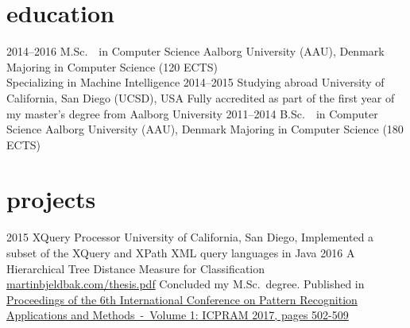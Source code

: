 \documentclass{afriggeri-cv/friggeri-cv}
\newcommand{\aau}{%
  Aalborg University (AAU), Denmark
}
\begin{document}
\section{education}

\begin{entrylist}
  \entry%
    {2014--2016}
    {M.Sc.\ {\normalfont\ in Computer Science}}
    {\aau}
    {Majoring in Computer Science (120 ECTS)\\
    Specializing in Machine Intelligence}
  \entry%
    {2014--2015}
    {Studying abroad}
    {University of California, San Diego (UCSD), USA}
    {Fully accredited as part of the first year of my master's degree from Aalborg University}
  \entry%
    {2011--2014}
    {B.Sc.\ {\normalfont\ in Computer Science}}
    {\aau}
    {Majoring in Computer Science (180 ECTS)}
\end{entrylist}

\section{projects}
\begin{entrylist}
  \entry%
    {2015}
    {XQuery Processor}
    {University of California, San Diego, }
    {Implemented a subset of the XQuery and XPath XML query languages in Java}
  \entry%
    {2016}
    {A Hierarchical Tree Distance Measure for Classification}
    {\href{https://martinbjeldbak.com/thesis.pdf}{martinbjeldbak.com/thesis.pdf}}
    {Concluded my M.Sc.\ degree. Published in \href{https://www.scitepress.org/Papers/2017/61985/}{Proceedings of the 6th International Conference on Pattern Recognition Applications and Methods~-~Volume 1: ICPRAM 2017, pages 502-509}}
\end{entrylist}
\end{document}
